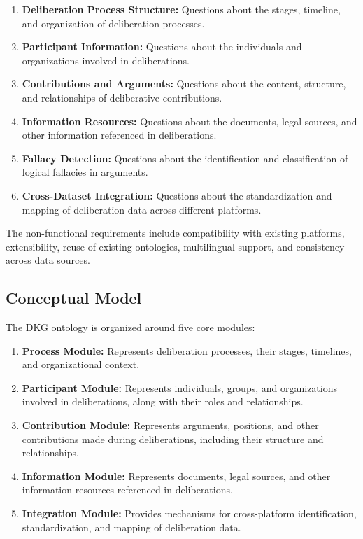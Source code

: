 \documentclass[runningheads]{llncs}  %
\begin{document}
\begin{enumerate}
    \item \textbf{Deliberation Process Structure:} Questions about the stages, timeline, and organization of deliberation processes.
    \item \textbf{Participant Information:} Questions about the individuals and organizations involved in deliberations.
    \item \textbf{Contributions and Arguments:} Questions about the content, structure, and relationships of deliberative contributions.
    \item \textbf{Information Resources:} Questions about the documents, legal sources, and other information referenced in deliberations.
    \item \textbf{Fallacy Detection:} Questions about the identification and classification of logical fallacies in arguments.
    \item \textbf{Cross-Dataset Integration:} Questions about the standardization and mapping of deliberation data across different platforms.
\end{enumerate}

The non-functional requirements include compatibility with existing platforms, extensibility, reuse of existing ontologies, multilingual support, and consistency across data sources.

\subsection{Conceptual Model}
The DKG ontology is organized around five core modules:
\begin{enumerate}
    \item \textbf{Process Module:} Represents deliberation processes, their stages, timelines, and organizational context.
    \item \textbf{Participant Module:} Represents individuals, groups, and organizations involved in deliberations, along with their roles and relationships.
    \item \textbf{Contribution Module:} Represents arguments, positions, and other contributions made during deliberations, including their structure and relationships.
    \item \textbf{Information Module:} Represents documents, legal sources, and other information resources referenced in deliberations.
    \item \textbf{Integration Module:} Provides mechanisms for cross-platform identification, standardization, and mapping of deliberation data.
\end{enumerate}
\end{document}
